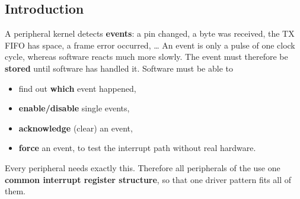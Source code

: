 
\newcommand{\asirqwlabel}[2]{\node[anchor=east,font=\scriptsize] at (0,#1+0.2) {#2};}
\newcommand{\asirqwgrid}[1]{\foreach \t in {0,...,#1} \draw[very thin,lightgray] (\t,-0.2) -- (\t,6.2);}

\subsection{Introduction}
\label{subsec:archirqintro}

A peripheral kernel detects \textbf{events}: a pin changed, a byte was
received, the TX FIFO has space, a frame error occurred, \ldots{} An event is
only a pulse of one clock cycle, whereas software reacts much more slowly.
The event must therefore be \textbf{stored} until software has handled it.
Software must be able to
\begin{itemize}
  \item find out \textbf{which} event happened,
  \item \textbf{enable/disable} single events,
  \item \textbf{acknowledge} (clear) an event,
  \item \textbf{force} an event, to test the interrupt path without real hardware.
\end{itemize}
Every peripheral needs exactly this. Therefore all peripherals of the
\aschip use one \textbf{common interrupt register structure}, so that one
driver pattern fits all of them.

